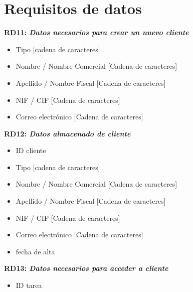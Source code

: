 \documentclass[paper=a4, fontsize=11pt, spanish]{scrartcl}
\begin{document}
\section{Requisitos de datos}
\setlength{\parindent}{0em}
\textbf{RD11: \textit{ Datos necesarios para crear un nuevo cliente}}
\setlength{\parindent}{2em}
\begin{itemize}

	\item Tipo [cadena de caracteres]
	
	\item Nombre / Nombre Comercial [Cadena de caracteres]
	
	\item Apellido / Nombre Fiscal [Cadena de caracteres]
	
	\item NIF / CIF [Cadena de caracteres]
	
	\item Correo electrónico [Cadena de caracteres]

\end{itemize}
\setlength{\parindent}{0em}
\textbf{RD12: \textit{Datos almacenado de cliente}}
\setlength{\parindent}{2em}
\begin{itemize}
	\item ID cliente
	
	\item Tipo [cadena de caracteres]
	
	\item Nombre / Nombre Comercial [Cadena de caracteres]
	
	\item Apellido / Nombre Fiscal [Cadena de caracteres]
	
	\item NIF / CIF [Cadena de caracteres]
	
	\item Correo electrónico [Cadena de caracteres]
	
	\item fecha de alta
\end{itemize}

\setlength{\parindent}{0em}
\textbf{RD13: \textit{Datos necesarios para acceder a cliente}}
\setlength{\parindent}{2em}
\begin{itemize}
	\item ID tarea
\end{itemize}
\end{document}
